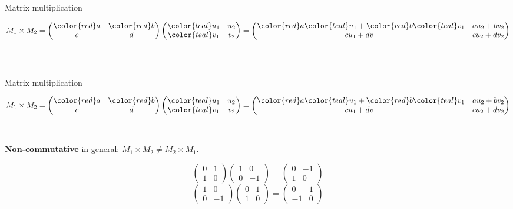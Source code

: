 \documentclass[aspectratio=169,12pt]{beamer}
\begin{document}
\begin{frame}{Matrix multiplication}

  \[ M_1 \times M_2 = \begin{pmatrix}
      {\color{red}a} & {\color{red}b} \\
      c & d
    \end{pmatrix}
    \begin{pmatrix}
      {\color{teal}u_1} & u_2 \\
      {\color{teal}v_1} & v_2
    \end{pmatrix}
    =
    \begin{pmatrix}
      {\color{red}a}{\color{teal}u_1} + {\color{red}b}{\color{teal}v_1} & au_2 + bv_2 \\
      cu_1 + dv_1 & cu_2 + dv_2
    \end{pmatrix}
  \]
\\~\\
\end{frame}

\begin{frame}{Matrix multiplication}

  \[ M_1 \times M_2 = \begin{pmatrix}
      {\color{red}a} & {\color{red}b} \\
      c & d
    \end{pmatrix}
    \begin{pmatrix}
      {\color{teal}u_1} & u_2 \\
      {\color{teal}v_1} & v_2
    \end{pmatrix}
    =
    \begin{pmatrix}
      {\color{red}a}{\color{teal}u_1} + {\color{red}b}{\color{teal}v_1} & au_2 + bv_2 \\
      cu_1 + dv_1 & cu_2 + dv_2
    \end{pmatrix}
  \]
\\~\\
    \textbf{Non-commutative} in general: $M_1 \times M_2 \neq M_2 \times M_1$.
  
  \bigskip
  \[
    \begin{pmatrix}
      0 & 1 \\
      1 & 0
    \end{pmatrix}
    \begin{pmatrix}
      1 & 0 \\
      0 & -1
    \end{pmatrix}
    =
    \begin{pmatrix}
      0 & -1 \\
      1 & 0
    \end{pmatrix}
      \]
  \bigskip
  \[
    \begin{pmatrix}
      1 & 0 \\
      0 & -1
    \end{pmatrix}
    \begin{pmatrix}
      0 & 1 \\
      1 & 0
    \end{pmatrix}
    =
    \begin{pmatrix}
      0 & 1 \\
      -1 & 0
    \end{pmatrix}
  \]
\end{frame}
\end{document}
